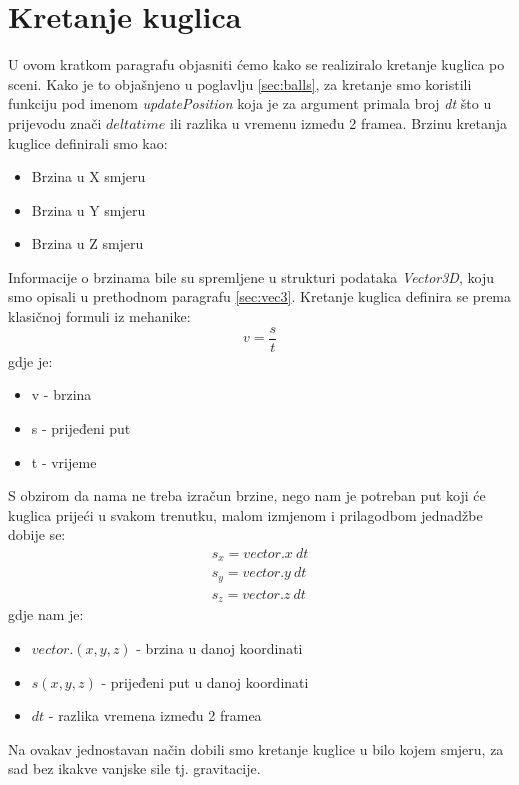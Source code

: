 \section{Kretanje kuglica}
U ovom kratkom paragrafu objasniti ćemo kako se realiziralo kretanje kuglica po sceni. Kako je to objašnjeno u poglavlju \ref{sec:balls}, za kretanje smo koristili funkciju pod imenom \emph{updatePosition} koja je za argument primala broj \emph{dt} što u prijevodu znači $delta time$ ili razlika u vremenu između 2 framea. 
Brzinu kretanja kuglice definirali smo kao:
\begin{itemize}
	\item Brzina u X smjeru
	\item Brzina u Y smjeru
	\item Brzina u Z smjeru
\end{itemize}
Informacije o brzinama bile su spremljene u strukturi podataka \emph{Vector3D}, koju smo opisali u prethodnom paragrafu \ref{sec:vec3}. Kretanje kuglica definira se prema klasičnoj formuli iz mehanike:
\begin{equation}
		v = \frac{s}{t} \label{equ:brzina}
\end{equation}
gdje je:
\begin{itemize}
	\item v - brzina
	\item s - prijeđeni put
	\item t - vrijeme 
\end{itemize}
S obzirom da nama ne treba izračun brzine, nego nam je potreban put koji će kuglica prijeći u svakom trenutku, malom izmjenom i prilagodbom jednadžbe dobije se:
\begin{equation}\label{equ:put}
\begin{aligned}
	s_x = vector.x \ dt\\
	s_y = vector.y \ dt\\
	s_z = vector.z \ dt
	\end{aligned}
\end{equation}
gdje nam je:
\begin{itemize}
	\item $vector.(x,y,z)$ - brzina u danoj koordinati
	\item $s (x,y,z)$ - prijeđeni put u danoj koordinati
	\item $dt$ - razlika vremena između 2 framea
\end{itemize}
Na ovakav jednostavan način dobili smo kretanje kuglice u bilo kojem smjeru, za sad bez ikakve vanjske sile tj. gravitacije.
